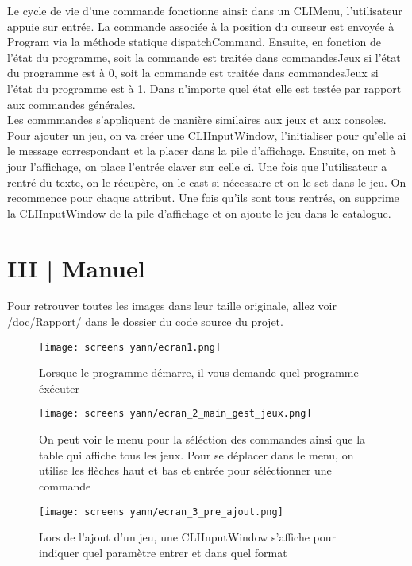 \documentclass[11pt]{article}
\begin{document}
    Le cycle de vie d'une commande fonctionne ainsi: dans un CLIMenu, l'utilisateur appuie sur entrée. La commande associée à la position du curseur est envoyée à Program via la méthode statique dispatchCommand. Ensuite, en fonction de l'état du programme, soit la commande est traitée dans commandesJeux si l'état du programme est à 0, soit la commande est traitée dans commandesJeux si l'état du programme est à 1. Dans n'importe quel état elle est testée par rapport aux commandes générales. 
    \\
    Les commmandes s'appliquent de manière similaires aux jeux et aux consoles. 
    \\
    Pour ajouter un jeu, on va créer une CLIInputWindow, l'initialiser pour qu'elle ai le message correspondant et la placer dans la pile d'affichage. Ensuite, on met à jour l'affichage, on place l'entrée claver sur celle ci. Une fois que l'utilisateur a rentré du texte, on le récupère, on le cast si nécessaire et on le set dans le jeu. On recommence pour chaque attribut. Une fois qu'ils sont tous rentrés, on supprime la CLIInputWindow de la pile d'affichage et on ajoute le jeu dans le catalogue.
    
\newpage
\fancyhf{}
    \section*{III | Manuel}
    Pour retrouver toutes les images dans leur taille originale, allez voir /doc/Rapport/ dans le dossier du code source du projet.
    \begin{figure}[ht]
        \centering
        \texttt{[image: screens yann/ecran1.png]}
        \caption{ Lorsque le programme démarre, il vous demande quel programme éxécuter}
        
        \vspace{\baselineskip}
        
        \centering
        \texttt{[image: screens yann/ecran\_2\_main\_gest\_jeux.png]}
        \caption{On peut voir le menu pour la séléction des commandes ainsi que la table qui affiche tous les jeux. Pour se déplacer dans le menu, on utilise les flèches haut et bas et entrée pour séléctionner une commande}
        
        \vspace{\baselineskip}
        
        \centering
        \texttt{[image: screens yann/ecran\_3\_pre\_ajout.png]}
        \caption{Lors de l'ajout d'un jeu, une CLIInputWindow s'affiche pour indiquer quel paramètre entrer et dans quel format}
    \end{figure}
    
\end{document}
